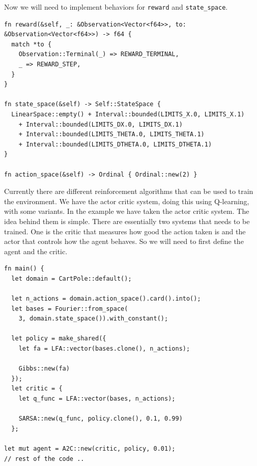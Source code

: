 \documentclass{book}
\begin{document}
Now we will need to implement behaviors for \lstinline{reward} and \lstinline{state_space}.

\begin{lstlisting}[caption={chapter3\\/rsrl\_custom\\/src\\/main\\.rs},basicstyle=\small]
fn reward(&self, _: &Observation<Vector<f64>>, to: &Observation<Vector<f64>>) -> f64 {
  match *to {
    Observation::Terminal(_) => REWARD_TERMINAL,
    _ => REWARD_STEP,
  }
}

fn state_space(&self) -> Self::StateSpace {
  LinearSpace::empty() + Interval::bounded(LIMITS_X.0, LIMITS_X.1)
    + Interval::bounded(LIMITS_DX.0, LIMITS_DX.1)
    + Interval::bounded(LIMITS_THETA.0, LIMITS_THETA.1)
    + Interval::bounded(LIMITS_DTHETA.0, LIMITS_DTHETA.1)
}

fn action_space(&self) -> Ordinal { Ordinal::new(2) }
\end{lstlisting}

Currently there are different reinforcement algorithms that can be used to train the environment. We have the actor critic system, doing this using Q-learning, with some variants. In the example we have taken the actor critic system. The idea behind them is simple. There are essentially two systems that needs to be trained. One is the critic that measures how good the action taken is and the actor that controls how the agent behaves. So we will need to first define the agent and the critic.

\begin{lstlisting}[caption={chapter3\\/rsrl\_custom\\/src\\/main\\.rs},basicstyle=\small]
fn main() {
  let domain = CartPole::default();

  let n_actions = domain.action_space().card().into();
  let bases = Fourier::from_space(
    3, domain.state_space()).with_constant();

  let policy = make_shared({
    let fa = LFA::vector(bases.clone(), n_actions);

    Gibbs::new(fa)
  });
  let critic = {
    let q_func = LFA::vector(bases, n_actions);

    SARSA::new(q_func, policy.clone(), 0.1, 0.99)
  };

let mut agent = A2C::new(critic, policy, 0.01);
// rest of the code ..
\end{lstlisting}
\end{document}
